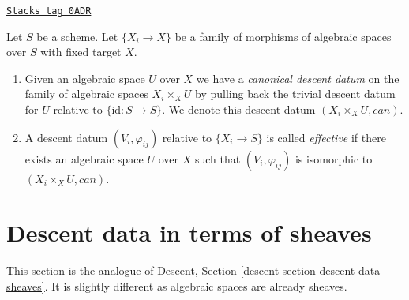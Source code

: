 \begin{definition}
\label{spaces-descent-definition-effective-family}
\href{https://stacks.math.columbia.edu/tag/0ADR}{\texttt{Stacks tag 0ADR}}

Let $S$ be a scheme.
Let $\{X_i \to X\}$ be a family of morphisms of algebraic spaces over $S$
with fixed target $X$.
\begin{enumerate}
\item  Given an algebraic space $U$ over $X$
we have a {\it canonical descent datum} on the family of
algebraic spaces $X_i \times_X U$ by pulling back the trivial
descent datum for $U$ relative to $\{\text{id} : S \to S\}$.
We denote this descent datum $(X_i \times_X U, can)$.
\item A descent datum $(V_i, \varphi_{ij})$
relative to $\{X_i \to S\}$ is called {\it effective}
if there exists an algebraic space $U$ over $X$ such that
$(V_i, \varphi_{ij})$ is isomorphic to $(X_i \times_X U, can)$.
\end{enumerate}
\end{definition}

\section{Descent data in terms of sheaves}
\label{spaces-descent-section-descent-data-sheaves}
This section is the analogue of Descent, Section
\ref{descent-section-descent-data-sheaves}.
It is slightly different as algebraic spaces are already sheaves.


